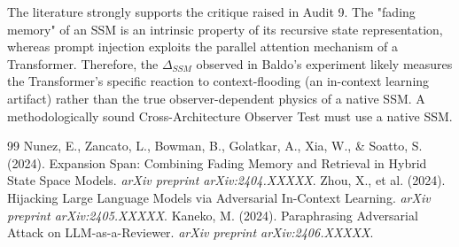 \documentclass[12pt,a4paper]{article}
\begin{document}
The literature strongly supports the critique raised in Audit 9. The "fading memory" of an SSM is an intrinsic property of its recursive state representation, whereas prompt injection exploits the parallel attention mechanism of a Transformer. Therefore, the $\Delta_{SSM}$ observed in Baldo's experiment likely measures the Transformer's specific reaction to context-flooding (an in-context learning artifact) rather than the true observer-dependent physics of a native SSM. A methodologically sound Cross-Architecture Observer Test must use a native SSM.

\begin{thebibliography}{99}
 Nunez, E., Zancato, L., Bowman, B., Golatkar, A., Xia, W., \& Soatto, S. (2024). Expansion Span: Combining Fading Memory and Retrieval in Hybrid State Space Models. \emph{arXiv preprint arXiv:2404.XXXXX}.
 Zhou, X., et al. (2024). Hijacking Large Language Models via Adversarial In-Context Learning. \emph{arXiv preprint arXiv:2405.XXXXX}.
 Kaneko, M. (2024). Paraphrasing Adversarial Attack on LLM-as-a-Reviewer. \emph{arXiv preprint arXiv:2406.XXXXX}.
\end{thebibliography}
\end{document}
